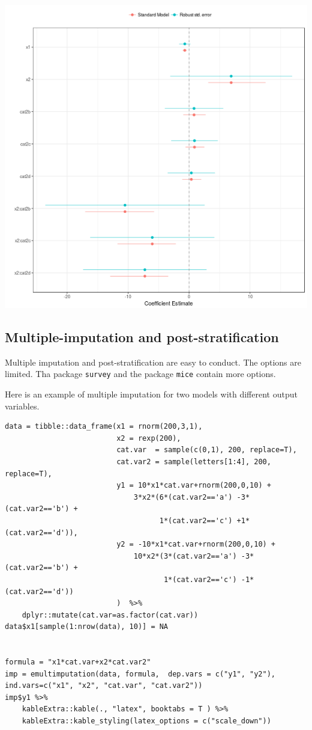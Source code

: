 \documentclass[a4paper]{article}
\begin{document}
\begin{center}
\includegraphics[width=.9\linewidth]{dotwisker-1.png}
\end{center}
\subsection{Multiple-imputation and post-stratification}
\label{sec:org3544888}
Multiple imputation and post-stratification are easy to conduct. The options are limited. Tha package \texttt{survey} and the package \texttt{mice} contain more options.

Here is an example of multiple imputation for two models with different output variables.

\lstset{numbers=left,language=r,label= ,caption= ,captionpos=b}
\begin{lstlisting}
data = tibble::data_frame(x1 = rnorm(200,3,1),
                          x2 = rexp(200),
                          cat.var  = sample(c(0,1), 200, replace=T),
                          cat.var2 = sample(letters[1:4], 200, replace=T),
                          y1 = 10*x1*cat.var+rnorm(200,0,10) +
                              3*x2*(6*(cat.var2=='a') -3*(cat.var2=='b') +
                                    1*(cat.var2=='c') +1*(cat.var2=='d')),
                          y2 = -10*x1*cat.var+rnorm(200,0,10) +
                              10*x2*(3*(cat.var2=='a') -3*(cat.var2=='b') +
                                     1*(cat.var2=='c') -1*(cat.var2=='d'))
                          )  %>%
    dplyr::mutate(cat.var=as.factor(cat.var)) 
data$x1[sample(1:nrow(data), 10)] = NA


formula = "x1*cat.var+x2*cat.var2"
imp = emultimputation(data, formula,  dep.vars = c("y1", "y2"), ind.vars=c("x1", "x2", "cat.var", "cat.var2"))
imp$y1 %>%
    kableExtra::kable(., "latex", booktabs = T ) %>%
    kableExtra::kable_styling(latex_options = c("scale_down"))

\end{lstlisting}
\end{document}
